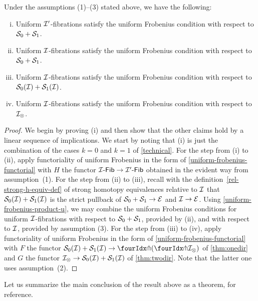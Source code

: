 \documentclass[reqno,10pt,a4paper,oneside,draft]{amsart}
\begin{document}
\begin{proposition} Under the assumptions {\normalfont (1)--(3)} stated above, we have the following:
\begin{enumerate}[(i)]
\item
Uniform $\cal{I}'$-fibrations satisfy the uniform Frobenius condition with respect to $\cal{S}_0 + \cal{S}_1$.
\item
Uniform $\cal{I}$-fibrations satisfy the uniform Frobenius condition with respect to $\cal{S}_0 + \cal{S}_1$.
\item
Uniform $\cal{I}$-fibrations satisfy the uniform Frobenius condition with respect to $\cal{S}_0(\cal{I}) + \cal{S}_1(\cal{I})$.
\item
Uniform $\cal{I}$-fibrations satisfy the uniform Frobenius condition with respect to $\cal{I}_\otimes$.
\end{enumerate}
\end{proposition}

\begin{proof} We begin by proving (i) and then show that the other claims hold by a linear sequence of implications.
We start by noting that (i) is just the combination of the cases $k = 0$ and $k = 1$ of \cref{technical}.
For the step from (i) to (ii), apply functoriality of uniform Frobenius in the form of \cref{uniform-frobenius-functorial} with $H$ the functor $\Fib{\cal{I}} \to \Fib{\cal{I}'}$ obtained in the evident way from assumption~(1).
For the step from (ii) to (iii), recall with the definition~\eqref{rel-strong-h-equiv-def} of strong homotopy equivalences relative to $\cal{I}$ that $\cal{S}_0(\cal{I}) + \cal{S}_1(\cal{I})$ is the strict pullback of $\cal{S}_0 + \cal{S}_1 \to \cal{E}$ and $\cal{I} \to \cal{E}$.
Using \cref{uniform-frobenius-product-u}, we may combine the uniform Frobenius conditions for uniform $\cal{I}$-fibrations with respect to $\cal{S}_0 + \cal{S}_1$, provided by (ii), and with respect to $\cal{I}$, provided by assumption (3).
For the step from (iii) to (iv), apply functoriality of uniform Frobenius in the form of \cref{uniform-frobenius-functorial} with $F$ the functor $\cal{S}_0(\cal{I}) + \cal{S}_1(\cal{I}) \to \liftl{(\liftr{\cal{I}_\otimes})}$ of \cref{thm:onedir} and $G$ the functor $\cal{I}_\otimes \to \cal{S}_0(\cal{I}) + \cal{S}_1(\cal{I})$ of \cref{thm:twodir}.
Note that the latter one uses assumption~(2).
\end{proof}

Let us summarize the main conclusion of the result above as a theorem, for reference.
\end{document}
